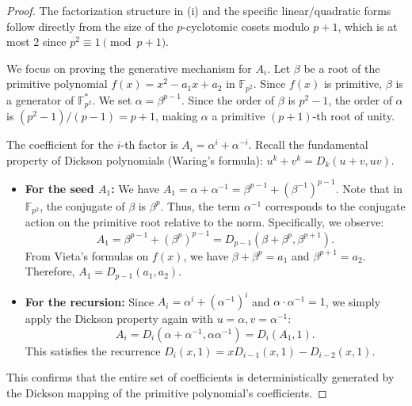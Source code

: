 \documentclass[10pt,a4paper]{amsart}
\begin{document}
\begin{proof}
The factorization structure in (i) and the specific linear/quadratic forms follow directly from the size of the $p$-cyclotomic cosets modulo $p+1$, which is at most 2 since $p^2 \equiv 1 \pmod{p+1}$.

We focus on proving the generative mechanism for $A_i$. Let $\beta$ be a root of the primitive polynomial $f(x) = x^2 - a_1 x + a_2$ in $\mathbb{F}_{p^2}$. Since $f(x)$ is primitive, $\beta$ is a generator of $\mathbb{F}_{p^2}^*$. We set $\alpha = \beta^{p-1}$. Since the order of $\beta$ is $p^2-1$, the order of $\alpha$ is $(p^2-1)/(p-1) = p+1$, making $\alpha$ a primitive $(p+1)$-th root of unity.

The coefficient for the $i$-th factor is $A_i = \alpha^i + \alpha^{-i}$. Recall the fundamental property of Dickson polynomials (Waring's formula): $u^k + v^k = D_k(u+v, uv)$.
\begin{itemize}
    \item \textbf{For the seed $A_1$:} We have $A_1 = \alpha + \alpha^{-1} = \beta^{p-1} + (\beta^{-1})^{p-1}$. Note that in $\mathbb{F}_{p^2}$, the conjugate of $\beta$ is $\beta^p$. Thus, the term $\alpha^{-1}$ corresponds to the conjugate action on the primitive root relative to the norm. Specifically, we observe:
    $$A_1 = \beta^{p-1} + (\beta^p)^{p-1} = D_{p-1}(\beta+\beta^p, \beta^{p+1}).$$
    From Vieta's formulas on $f(x)$, we have $\beta + \beta^p = a_1$ and $\beta^{p+1} = a_2$. Therefore, $A_1 = D_{p-1}(a_1, a_2)$.
    
    \item \textbf{For the recursion:} Since $A_i = \alpha^i + (\alpha^{-1})^i$ and $\alpha \cdot \alpha^{-1} = 1$, we simply apply the Dickson property again with $u=\alpha, v=\alpha^{-1}$:
    $$A_i = D_i(\alpha + \alpha^{-1}, \alpha \alpha^{-1}) = D_i(A_1, 1).$$
    This satisfies the recurrence $D_i(x, 1) = x D_{i-1}(x, 1) - D_{i-2}(x, 1)$.
\end{itemize}
This confirms that the entire set of coefficients is deterministically generated by the Dickson mapping of the primitive polynomial's coefficients.
\end{proof}
\end{document}
